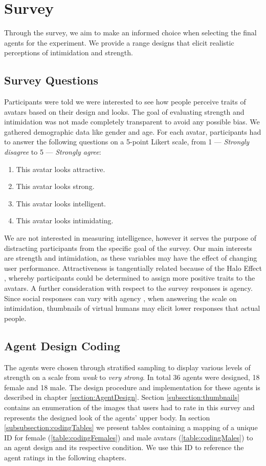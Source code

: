 
\section{Survey}
Through the survey, we aim to make an informed choice when selecting the final agents for the experiment. We provide a range designs that elicit realistic perceptions of intimidation and strength. 

\subsection{Survey Questions}
Participants were told we were interested to see how people perceive traits of avatars based on their design and looks. The goal of evaluating strength and intimidation was not made completely transparent to avoid any possible bias. We gathered demographic data like gender and age. For each avatar, participants had to answer the following questions on a 5-point Likert scale, from 1 --- \textit{Strongly disagree} to 5 --- \textit{Strongly agree}:
\begin{enumerate}
\itemsep0em 
\item This avatar looks attractive.
\item This avatar looks strong.
\item This avatar looks intelligent.
\item This avatar looks intimidating.
\end{enumerate}
We are not interested in measuring intelligence, however it serves the purpose of distracting participants from the specific goal of the survey. Our main interests are strength and intimidation, as these variables may have the effect of changing user performance. Attractiveness is tangentially related because of the Halo Effect \cite{nisbett1977halo}, whereby participants could be determined to assign more positive traits to the avatars. A further consideration with respect to the survey responses is agency. Since social responses can vary with agency \cite{fox2015avatars}, when answering the scale on intimidation, thumbnails of virtual humans may elicit lower responses that actual people.
 
\subsection{Agent Design Coding}
The agents were chosen through stratified sampling to display various levels of strength on a scale from \textit{weak} to \textit{very strong}. In total 36 agents were designed, 18 female and 18 male. The design procedure and implementation for these agents is described in chapter \ref{section:AgentDesign}. Section \ref{subsection:thumbnails} contains an enumeration of the images that users had to rate in this survey and represents the designed look of the agents' upper body. In section \ref{subsubsection:codingTables} we present tables containing a mapping of a unique ID for female (\ref{table:codingFemales}) and male avatars (\ref{table:codingMales}) to an agent design and its respective condition. We use this ID to reference the agent ratings in the following chapters.

